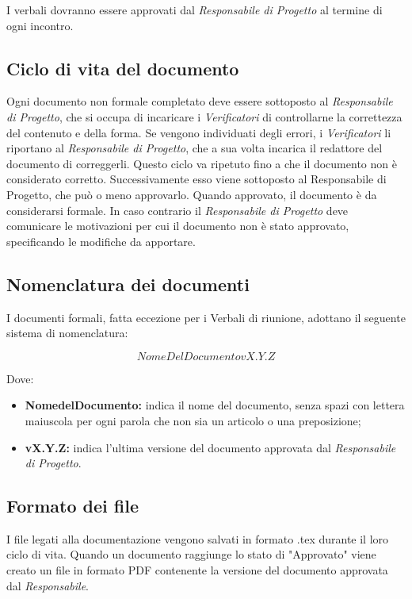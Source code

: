 \documentclass[../NormediProgetto.tex]{subfiles}
\begin{document}
\noindent I verbali dovranno essere approvati dal \textit{Responsabile di Progetto} al termine di ogni incontro.

\subsection{Ciclo di vita del documento}

Ogni documento non formale completato deve essere sottoposto al \textit{Responsabile di Progetto}, che si occupa di incaricare i \textit{Verificatori} di controllarne la correttezza del contenuto e della forma. Se vengono individuati degli errori, i \textit{Verificatori} li riportano al \textit{Responsabile di Progetto}, che a sua volta incarica il redattore del documento di correggerli. Questo ciclo va ripetuto fino a che il documento non è considerato corretto. Successivamente esso viene sottoposto al Responsabile di Progetto, che può o meno approvarlo. Quando approvato, il documento è da considerarsi formale. In caso contrario il \textit{Responsabile di Progetto} deve comunicare le motivazioni per cui il documento non è stato approvato, specificando le modifiche da apportare.

\subsection{Nomenclatura dei documenti}

I documenti formali, fatta eccezione per i Verbali di riunione, adottano il seguente sistema di nomenclatura:

\[NomeDelDocumento vX.Y.Z\]

Dove:

\begin{itemize}
	\item \textbf{NomedelDocumento:} indica il nome del documento, senza spazi con lettera maiuscola per ogni parola che non sia un articolo o una preposizione;
	
	\item \textbf{vX.Y.Z:}  indica l'ultima versione del documento approvata dal \textit{Responsabile di Progetto}.
\end{itemize}

\subsection{Formato dei file}
I file legati alla documentazione vengono salvati in formato .tex durante il loro ciclo di vita. Quando un documento raggiunge lo stato di "Approvato" viene creato un file in formato PDF contenente la versione del documento approvata dal \textit{Responsabile}.
\end{document}
